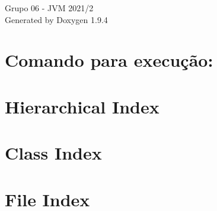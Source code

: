 \documentclass[twoside]{book}
\newcommand{\+}{\discretionary{\mbox{\scriptsize$\hookleftarrow$}}{}{}}
\newcommand{\clearemptydoublepage}{%
    \newpage{\pagestyle{empty}\cleardoublepage}%
  }
\begin{document}
  \raggedbottom
    \hypersetup{pageanchor=false,
                bookmarksnumbered=true,
                pdfencoding=unicode
               }
  \begin{titlepage}
  \vspace*{7cm}
  \begin{center}%
  {\Large Grupo 06 -\/  JVM 2021/2}\\
  \vspace*{1cm}
  {\large Generated by Doxygen 1.9.4}\\
  \end{center}
  \end{titlepage}
  \clearemptydoublepage
  \tableofcontents
  \clearemptydoublepage
  \hypersetup{pageanchor=true}
\chapter{Comando para execução\+:}
\label{index}\hypertarget{index}{}
\chapter{Hierarchical Index}

\chapter{Class Index}

\chapter{File Index}

\end{document}
